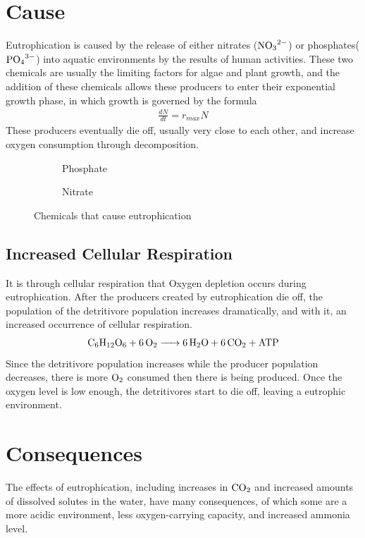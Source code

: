 \documentclass{article}
\begin{document}
\section{Cause}
Eutrophication is caused by the release of either nitrates ($\ce{NO3^2-}$) or phosphates($\ce{PO4^3-}$) into aquatic environments by the results of human activities.
These two chemicals are usually the limiting factors for algae and plant growth, and the addition of these chemicals allows these producers to enter their exponential growth phase, in which growth is governed by the formula
\begin{align}
    \frac{dN}{dt} = r_{max}N
\end{align}
These producers eventually die off, usually very close to each other, and increase oxygen consumption through decomposition.
\begin{figure}[h]
    \begin{subfigure}{.5\textwidth}
        \centering
        \caption{Phosphate}
    \end{subfigure}%
    \begin{subfigure}{.5\textwidth}
        \centering
        \caption{Nitrate}
    \end{subfigure}
    \caption{Chemicals that cause eutrophication}
\end{figure}
    \subsection{Increased Cellular Respiration}
    It is through cellular respiration that Oxygen depletion occurs during eutrophication. 
    After the producers created by eutrophication die off, the population of the detritivore population increases dramatically, and with it, an increased occurrence of cellular respiration.
    \begin{align}
        \ce{C6H12O6 + 6O2 -> 6H2O + 6CO2 + ATP}
    \end{align}
    Since the detritivore population increases while the producer population decreases, there is more $\ce{O2}$ consumed then there is being produced. Once the oxygen level is low enough, the detritivores start to die off, leaving a eutrophic environment.
\section{Consequences}
The effects of eutrophication, including increases in $\ce{CO2}$ and increased amounts of dissolved solutes in the water, have many consequences, of which some are a more acidic environment, less oxygen-carrying capacity, and increased ammonia level.
\end{document}
